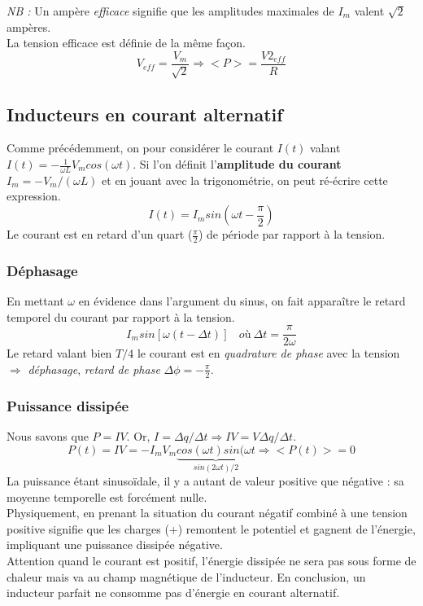 \documentclass	[11pt, a4paper, openany]{book}
\begin{document}
\textit{NB :} Un ampère \textit{efficace} signifie que les amplitudes maximales de $I_m$ valent $\sqrt{2}$ ampères.\\
La tension efficace est définie de la même façon.
\begin{equation}
V_{eff} = \frac{V_m}{\sqrt{2}} \Rightarrow <P> = \frac{V2_{eff}}{R}
\end{equation}

\subsection{Inducteurs en courant alternatif}
Comme précédemment, on pour considérer le courant  $I(t)$ valant $I(t) = -\frac{1}{\omega L}V_m cos(\omega t)$. Si l'on définit l'\textbf{amplitude du courant} $I_m = -V_m/(\omega L)$ et en jouant avec la trigonométrie, on peut ré-écrire cette expression.
\begin{equation}
I(t) = I_m sin(\omega t - \frac{\pi}{2})
\end{equation}
Le courant est en retard d'un quart ($\frac{\pi}{2}$) de période  par rapport à la tension.
\subsubsection{Déphasage}
En mettant $\omega$ en évidence dans l'argument du sinus, on fait apparaître le retard temporel du courant par rapport à la tension.
\begin{equation}
I_m sin[\omega (t - \Delta t)]\ \ \ \ où\ \Delta t = \frac{\pi}{2 \omega}
\end{equation}
Le retard valant bien $T/4$ le courant est en \textit{quadrature de phase} avec la tension $\Rightarrow$ \textit{déphasage}, \textit{retard de phase} $\Delta\phi = - \frac{\pi}{2}$.

\subsubsection{Puissance dissipée}
Nous savons que $P = IV$. Or, $I = \Delta q / \Delta t \Rightarrow IV = V \Delta q / \Delta t $.
\begin{equation}
P(t) = IV = -I_mV_m \underbrace{cos(\omega t)sin(\omega t}_{sin(2\omega t)/2} \Rightarrow <P(t)> = 0
\end{equation}
La puissance étant sinusoïdale, il y a autant de valeur positive que négative : sa moyenne temporelle est forcément nulle.\\
Physiquement, en prenant la situation du courant négatif combiné à une tension positive signifie que les charges (+) remontent le potentiel et gagnent de l'énergie, impliquant une puissance dissipée négative.\\
Attention quand le courant est positif, l'énergie dissipée ne sera pas sous forme de chaleur mais va au champ magnétique de l'inducteur. En conclusion, un inducteur parfait ne consomme pas d'énergie en courant alternatif.
\end{document}
